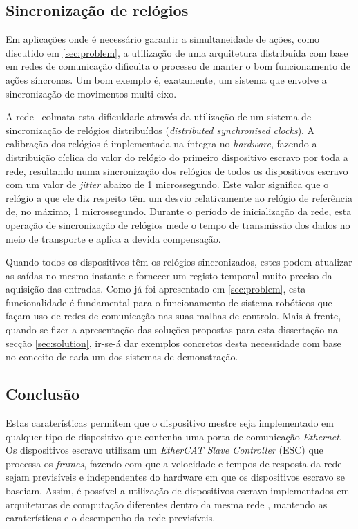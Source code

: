 \subsection{Sincronização de relógios}
Em aplicações onde é necessário garantir a simultaneidade de ações, como
discutido em \ref{sec:problem}, a utilização de uma arquitetura distribuída
com base em redes de comunicação dificulta o processo de manter o bom
funcionamento de ações síncronas. Um bom exemplo é, exatamente, um sistema
que envolve a sincronização de movimentos multi-eixo.

A rede \ecat\ colmata esta dificuldade através da utilização de um sistema
de sincronização de relógios distribuídos (\emph{distributed synchronised
clocks}). A calibração dos relógios é implementada na íntegra no
\emph{hardware}, fazendo a distribuição cíclica do valor do relógio do
primeiro dispositivo escravo por toda a rede, resultando numa sincronização
dos relógios de todos os dispositivos escravo com um valor de \emph{jitter}
abaixo de 1 microssegundo. Este valor significa que o relógio a que ele
diz respeito têm um desvio relativamente ao relógio de referência de,
no máximo, 1 microssegundo. Durante o período de inicialização da rede,
esta operação de sincronização de relógios mede o tempo de transmissão
dos dados no meio de transporte e aplica a devida compensação.

Quando todos os dispositivos têm os relógios sincronizados, estes podem
atualizar as saídas no mesmo instante e fornecer um registo temporal
muito preciso da aquisição das entradas. Como já foi apresentado em
\ref{sec:problem}, esta funcionalidade é fundamental para o funcionamento
de sistema robóticos que façam uso de redes de comunicação nas suas
malhas de controlo. Mais à frente, quando se fizer a apresentação das
soluções propostas para esta dissertação na secção \ref{sec:solution},
ir-se-á dar exemplos concretos desta necessidade com base no conceito
de cada um dos sistemas de demonstração.


\subsection{Conclusão}
Estas caraterísticas permitem que o dispositivo mestre seja implementado
em qualquer tipo de dispositivo que contenha uma porta de comunicação 
\emph{Ethernet}. Os dispositivos escravo utilizam um \emph{EtherCAT Slave
Controller} (ESC) que processa os \emph{frames}, fazendo com que a velocidade
e tempos de resposta da rede sejam previsíveis e independentes do hardware 
em que os dispositivos escravo se baseiam. Assim, é possível a utilização
de dispositivos escravo implementados em arquiteturas de computação
diferentes dentro da mesma rede \ecat, mantendo as caraterísticas e o
desempenho da rede previsíveis.


